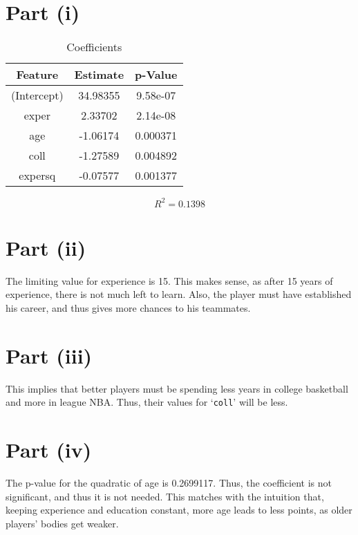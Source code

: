\documentclass{./solution}
\author{%
    Bhavishya Desai\\[-1mm]
    160194
    \and
    Nikhil Bansal\\[-1mm]
    160447
    \and
    Nishant Maheshwari\\[-1mm]
    160458
    \and
    Harish Rajagopal\\[-1mm]
    160552
    \and
    Akhil Reddy\\[-1mm]
    160613
    \and
    Sameer Meena\\[-1mm]
    160616
}
\begin{document}
    \maketitle

    \begin{solution}[Wooldridge C6.9]
        \section*{Part (i)}
            \begin{table}[H]
                \caption{Coefficients}
                \begin{tabularx}{\textwidth}{C C C}
                    \toprule
                    Feature & Estimate & p-Value \\
                    \midrule
                    (Intercept) & 34.98355 & 9.58e-07 \\
                    exper       &  2.33702 & 2.14e-08 \\
                    age         & -1.06174 & 0.000371 \\
                    coll        & -1.27589 & 0.004892 \\
                    expersq     & -0.07577 & 0.001377 \\
                    \bottomrule
                \end{tabularx}
            \end{table}
            \vspace{-5mm}
            $$ R^2 = 0.1398 $$

        \section*{Part (ii)}
            The limiting value for experience is 15.
            This makes sense, as after 15 years of experience, there is not much left to learn.
            Also, the player must have established his career, and thus gives more chances to his teammates.

        \section*{Part (iii)}
            This implies that better players must be spending less years in college basketball and more in league NBA.
            Thus, their values for `\texttt{coll}' will be less.

        \section*{Part (iv)}
            The p-value for the quadratic of age is 0.2699117.
            Thus, the coefficient is not significant, and thus it is not needed.
            This matches with the intuition that, keeping experience and education constant, more age leads to less points, as older players' bodies get weaker.


\end{solution}
\end{document}
